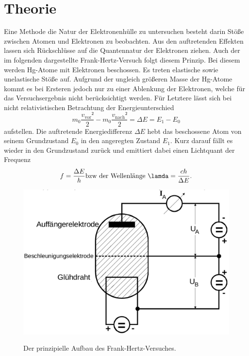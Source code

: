 
\section{Theorie}
\label{sec:Theorie}
Eine Methode die Natur der Elektronenhülle zu untersuchen besteht darin Stöße zwischen
Atomen und Elektronen zu beobachten.
Aus den auftretenden Effekten lassen sich Rückschlüsse auf die Quantennatur der Elektronen ziehen.
Auch der im folgenden dargestellte Frank-Hertz-Versuch folgt diesem Prinzip.
Bei diesem werden Hg-Atome mit Elektronen beschossen. Es treten elastische sowie unelastische Stöße auf.
Aufgrund der ungleich größeren Masse der Hg-Atome kommt es bei Ersteren jedoch nur
zu einer Ablenkung der Elektronen, welche für das Versuchsergebnis nicht berücksichtigt werden.
Für Letztere lässt sich bei nicht relativistischen Betrachtung der Energieunterschied
\begin{equation}
  m_0 \frac{v_\text{vor}²}{2} - m_0 \frac{v_\text{nach}²}{2} = \Delta E = E_1 - E_0\label{eq:Estoss}
  \end{equation}
  aufstellen.
Die auftretende Energiedifferenz $\Delta E$ hebt das beschossene
Atom von seinem Grundzustand $E_0$ in den angeregten Zustand $E_1$. Kurz
darauf fällt es wieder in den Grundzustand zurück und emittiert dabei einen Lichtquant der Frequenz
\begin{equation}
  f = \frac{\Delta E}{h} \label{eq:f} \text{bzw der Wellenlänge } \lamda = \frac{c h}{\Delta E}.
  \end{equation}

  \begin{figure}
 \centering
 \caption{Der prinzipielle Aufbau des Frank-Hertz-Versuches.}
 \includegraphics[width=\linewidth-170pt,height=\textheight-170pt,keepaspectratio]{content/franktheorie.png}
 \label{fig:franktheorie}
\end{figure}

